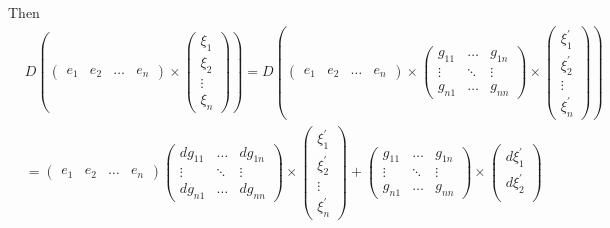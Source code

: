 \documentclass[a4paper,10pt]{amsart}
\begin{document}
Then
\begin{align*}
    &D(
    \begin{pmatrix}
       e_1 & e_2 & \ldots & e_n 
    \end{pmatrix}  \times 
    \begin{pmatrix}
       \xi_1\\
       \xi_2\\
       \vdots\\
       \xi_n
   \end{pmatrix}) = 
       D( \begin{pmatrix}
       e_1 & e_2 & \ldots & e_n 
    \end{pmatrix} \times
  \begin{pmatrix}
       g_{11} & \ldots & g_{1n}\\
       \vdots      & \ddots & \vdots \\
       g_{n1} & \ldots & g_{nn}
   \end{pmatrix}\times
    \begin{pmatrix}
       \xi_{1}^{'}\\
       \xi_{2}^{'}\\
       \vdots\\
       \xi_{n}^{'}
   \end{pmatrix}) \\
   & = \begin{pmatrix}
       e_1 & e_2 & \ldots & e_n 
    \end{pmatrix} 
   \begin{pmatrix}
       dg_{11} & \ldots & dg_{1n}\\
       \vdots      & \ddots & \vdots \\
       dg_{n1} & \ldots & dg_{nn}
   \end{pmatrix}\times
    \begin{pmatrix}
       \xi_{1}^{'}\\
       \xi_{2}^{'}\\
       \vdots\\
       \xi_{n}^{'}
   \end{pmatrix}  
    +
    \begin{pmatrix}
       g_{11} & \ldots & g_{1n}\\
       \vdots      & \ddots & \vdots \\
       g_{n1} & \ldots & g_{nn}
   \end{pmatrix}\times
    \begin{pmatrix}
       d\xi_{1}^{'}\\
       d\xi_{2}^{'}\\

\end{pmatrix}
\end{align*}
\end{document}
